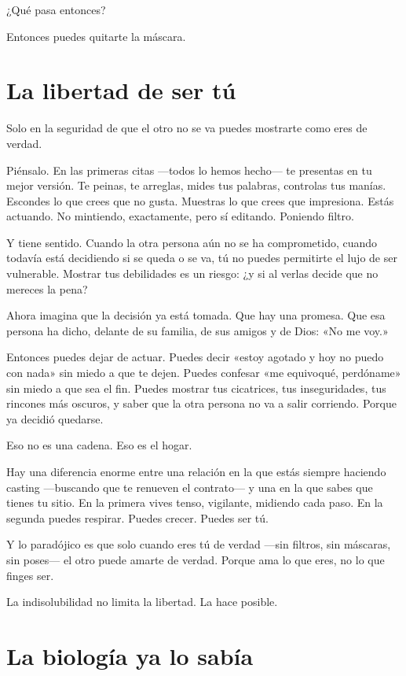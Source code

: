 ¿Qué pasa entonces?

Entonces puedes quitarte la máscara.

\section{La libertad de ser tú}

Solo en la seguridad de que el otro no se va puedes mostrarte como eres de verdad.

Piénsalo. En las primeras citas ---todos lo hemos hecho--- te presentas en tu mejor versión. Te peinas, te arreglas, mides tus palabras, controlas tus manías. Escondes lo que crees que no gusta. Muestras lo que crees que impresiona. Estás actuando. No mintiendo, exactamente, pero sí editando. Poniendo filtro.

Y tiene sentido. Cuando la otra persona aún no se ha comprometido, cuando todavía está decidiendo si se queda o se va, tú no puedes permitirte el lujo de ser vulnerable. Mostrar tus debilidades es un riesgo: ¿y si al verlas decide que no mereces la pena?

Ahora imagina que la decisión ya está tomada. Que hay una promesa. Que esa persona ha dicho, delante de su familia, de sus amigos y de Dios: «No me voy.»

Entonces puedes dejar de actuar. Puedes decir «estoy agotado y hoy no puedo con nada» sin miedo a que te dejen. Puedes confesar «me equivoqué, perdóname» sin miedo a que sea el fin. Puedes mostrar tus cicatrices, tus inseguridades, tus rincones más oscuros, y saber que la otra persona no va a salir corriendo. Porque ya decidió quedarse.

Eso no es una cadena. Eso es el hogar.

Hay una diferencia enorme entre una relación en la que estás siempre haciendo casting ---buscando que te renueven el contrato--- y una en la que sabes que tienes tu sitio. En la primera vives tenso, vigilante, midiendo cada paso. En la segunda puedes respirar. Puedes crecer. Puedes ser tú.

Y lo paradójico es que solo cuando eres tú de verdad ---sin filtros, sin máscaras, sin poses--- el otro puede amarte de verdad. Porque ama lo que eres, no lo que finges ser.

La indisolubilidad no limita la libertad. La hace posible.

\section{La biología ya lo sabía}

